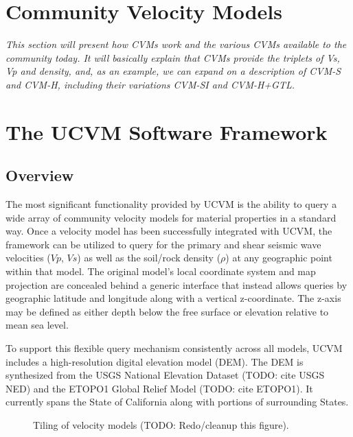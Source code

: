 


\section{Community Velocity Models}
\label{sec:cvms}

\textit{
\color{blue}
This section will present how CVMs work and the various CVMs available to the community today. It will basically explain that CVMs provide the triplets of Vs, Vp and density, and, as an example, we can expand on a description of CVM-S and CVM-H, including their variations CVM-SI and CVM-H+GTL.
}

\section{The UCVM Software Framework}\label{sec:ucvm}

\subsection{Overview}
The most significant functionality provided by UCVM is the ability to query a wide array of community velocity models for material properties in a standard way. Once a velocity model has been successfully integrated with UCVM, the framework can be utilized to query for the primary and shear seismic wave velocities ($Vp$, $Vs$) as well as the soil/rock density ($\rho$) at any geographic point within that model. The original model's local coordinate system and map projection are concealed behind a generic interface that instead allows queries by geographic latitude and longitude along with a vertical z-coordinate. The z-axis may be defined as either depth below the free surface or elevation relative to mean sea level.

To support this flexible query mechanism consistently across all models, UCVM includes a high-resolution digital elevation model (DEM). The DEM is synthesized from the USGS National Elevation Dataset (TODO: cite USGS NED) and the ETOPO1 Global Relief Model (TODO: cite ETOPO1). It currently spans the State of California along with portions of surrounding States. 
\begin{figure}
\centering
{}
\caption{Tiling of velocity models (TODO: Redo/cleanup this figure).}\label{fig:tiling}
\end{figure}

